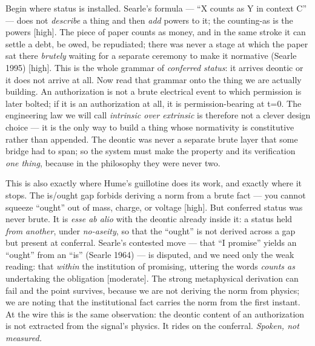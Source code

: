 \documentclass[11pt]{article}
\begin{document}
Begin where status is installed. Searle's formula — ``X counts as Y in context C'' — does not \emph{describe} a thing and then \emph{add} powers to it; the counting-as is the powers [high]. The piece of paper counts as money, and in the same stroke it can settle a debt, be owed, be repudiated; there was never a stage at which the paper sat there \emph{brutely} waiting for a separate ceremony to make it normative (Searle 1995) [high]. This is the whole grammar of \emph{conferred status}: it arrives deontic or it does not arrive at all. Now read that grammar onto the thing we are actually building. An authorization is not a brute electrical event to which permission is later bolted; if it is an authorization at all, it is permission-bearing at t=0. The engineering law we will call \emph{intrinsic over extrinsic} is therefore not a clever design choice — it is the only way to build a thing whose normativity is constitutive rather than appended. The deontic was never a separate brute layer that some bridge had to span; so the system must make the property and its verification \emph{one thing}, because in the philosophy they were never two.

This is also exactly where Hume's guillotine does its work, and exactly where it stops. The is/\allowbreak{}ought gap forbids deriving a norm from a brute fact — you cannot squeeze ``ought'' out of mass, charge, or voltage [high]. But conferred status was never brute. It is \emph{esse ab alio} with the deontic already inside it: a status held \emph{from another}, under \emph{no-aseity}, so that the ``ought'' is not derived across a gap but present at conferral. Searle's contested move — that ``I promise'' yields an ``ought'' from an ``is'' (Searle 1964) — is disputed, and we need only the weak reading: that \emph{within} the institution of promising, uttering the words \emph{counts as} undertaking the obligation [moderate]. The strong metaphysical derivation can fail and the point survives, because we are not deriving the norm from physics; we are noting that the institutional fact carries the norm from the first instant. At the wire this is the same observation: the deontic content of an authorization is not extracted from the signal's physics. It rides on the conferral. \emph{Spoken, not measured.}
\end{document}
